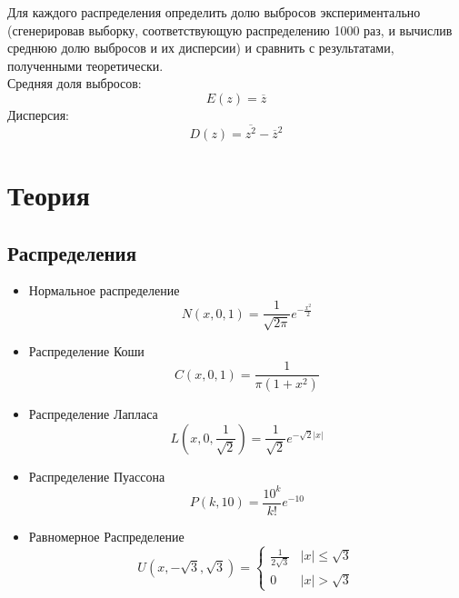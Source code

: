 \documentclass[12pt,a4paper]{article}
\begin{document}
	Для каждого распределения определить долю выбросов экспериментально (сгенерировав выборку, соответствующую распределению 1000 раз, и вычислив среднюю долю выбросов и их дисперсии) и сравнить с результатами, полученными теоретически.\\
	Средняя доля выбросов:
	\begin{equation}\label{eqn:expected_value}
		E(z)=\overline{z}
	\end{equation}
	Дисперсия:
	\begin{equation}\label{eqn:variance}
		D(z)=\overline{z^2}-\overline{z}^2
	\end{equation}
	
	\section{Теория}
	\subsection{Распределения}
	\begin{itemize}
		\item Нормальное распределение \begin{equation}\label{eqn:normal}
		N(x,0,1) = \frac{1}{\sqrt{2\pi}}e^{-\frac{x^2}{2}}
		\end{equation}
		
		\item Распределение Коши
		\begin{equation}\label{eqn:cauchy}
		C(x,0,1) = \frac{1}{\pi(1+x^2)}
		\end{equation}
		
		\item Распределение Лапласа
		\begin{equation}\label{eqn:laplace}
		L\left( x,0,\frac{1}{\sqrt{2}}\right) = \frac{1}{\sqrt{2}}e^{-\sqrt{2}\vert x\vert}
		\end{equation}
		
		\item Распределение Пуассона
		\begin{equation}\label{eqn:poisson}
		P(k,10) = \frac{10^k}{k!}e^{-10}
		\end{equation}
		
		\item Равномерное Распределение
		\begin{equation}\label{eqn:uniform}
		U(x,-\sqrt{3}, \sqrt{3}) = 
		\begin{cases}
		\frac{1}{2\sqrt{3}} &\vert x\vert \leqslant \sqrt{3}\\
		0 &\vert x\vert > \sqrt{3}
		\end{cases}
		\end{equation}
	\end{itemize}
	
\end{document}
